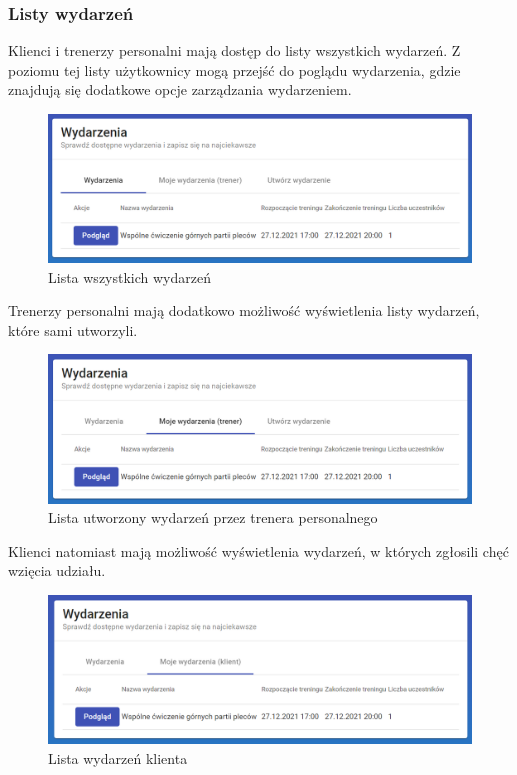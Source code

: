 \documentclass[a4paper,twoside,12pt]{book}
\begin{document}
{\subsubsection{Listy wydarzeń}
Klienci i trenerzy personalni mają dostęp do listy wszystkich wydarzeń. Z poziomu tej listy użytkownicy mogą przejść do poglądu wydarzenia, gdzie znajdują się dodatkowe opcje zarządzania wydarzeniem.
\begin{figure}[h!]
	\centering
	\includegraphics[width=1\linewidth]{../zrzuty_ekranu/dzialanie/wydarzenia/wszystkie_wydarzenia}
	\caption{Lista wszystkich wydarzeń}
	\label{fig:wszystkiewydarzenia}
\end{figure}
\FloatBarrier
Trenerzy personalni mają dodatkowo możliwość wyświetlenia listy wydarzeń, które sami utworzyli.
\begin{figure}[h!]
	\centering
	\includegraphics[width=1\linewidth]{../zrzuty_ekranu/dzialanie/wydarzenia/trener_lista_wydarzen}
	\caption{Lista utworzony wydarzeń przez trenera personalnego}
	\label{fig:trenerlistawydarzen}
\end{figure}
\FloatBarrier
\newpage
Klienci natomiast mają możliwość wyświetlenia wydarzeń, w których zgłosili chęć wzięcia udziału.
\begin{figure}[h!]
	\centering
	\includegraphics[width=0.9\linewidth]{../zrzuty_ekranu/dzialanie/wydarzenia/klient_lista_wydarzen}
	\caption{Lista wydarzeń klienta}
	\label{fig:klientlistawydarzen}
\end{figure}
\FloatBarrier

}
\end{document}
